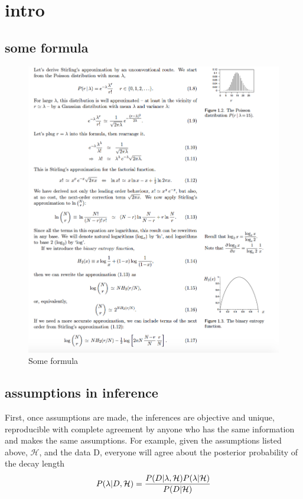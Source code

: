 \documentclass[a4paper,11pt]{article}
\numberwithin{equation}{section}
\begin{document}
 

\section{intro}
\subsection{some formula}
\begin{figure}[h!]
\centerline{\includegraphics[scale=0.6]{probability_formulae.png}}
\caption{Some formula}
\end{figure}

\subsection{assumptions in inference}

First, once assumptions are made, the inferences are objective and unique,
reproducible with complete agreement by anyone who has the same information
and makes the same assumptions. For example, given the assumptions
listed above, $\mathcal{H}$, and the data D, everyone will agree about the posterior probability
of the decay length
$$
P(\lambda | D, \mathcal{H})= {P(D|\lambda , \mathcal{H})P(\lambda |  \mathcal{H}) \over P(D|\mathcal{H})}
$$
\end{document}
